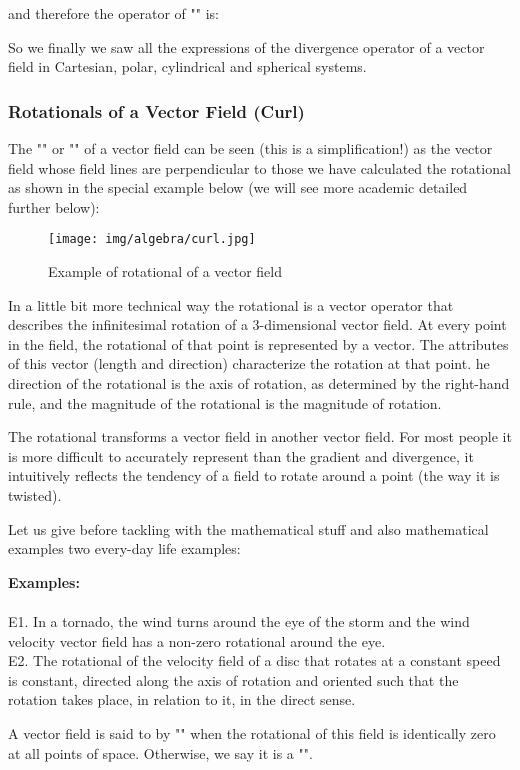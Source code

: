 	and therefore the operator of "" is:
	
	So we finally we saw all the expressions of the divergence operator of a vector field in Cartesian, polar, cylindrical and spherical systems.
	
	\pagebreak
	\subsubsection{Rotationals of a Vector Field (Curl)}\label{rotational}
	The "" or "" of a vector field can be seen (this is a simplification!) as the vector field whose field lines are perpendicular to those we have calculated the rotational as shown in the special example below (we will see more academic detailed further below):
	\begin{figure}[H]
	\centering
		\texttt{[image: img/algebra/curl.jpg]}
		\caption{Example of rotational of a vector field}
	\end{figure}
	In a little bit more technical way the rotational is a vector operator that describes the infinitesimal rotation of a $3$-dimensional vector field. At every point in the field, the rotational of that point is represented by a vector. The attributes of this vector (length and direction) characterize the rotation at that point. he direction of the rotational is the axis of rotation, as determined by the right-hand rule, and the magnitude of the rotational is the magnitude of rotation. 
	
	The rotational transforms a vector field in another vector field. For most people it is more difficult to accurately represent than the gradient and divergence, it intuitively reflects the tendency of a field to rotate around a point (the way it is twisted).
	
	Let us give before tackling with the mathematical stuff and also mathematical examples two every-day life examples:
	\begin{tcolorbox}[colframe=black,colback=white,sharp corners]
	\textbf{{\Large {}}Examples:}\\\\
	E1. In a tornado, the wind turns around the eye of the storm and the wind velocity vector field has a non-zero rotational around the eye.\\

	E2. The rotational of the velocity field of a disc that rotates at a constant speed is constant, directed along the axis of rotation and oriented such that the rotation takes place, in relation to it, in the direct sense.\\
	\end{tcolorbox}
	A vector field is said to by "\label{irrotational}" when the rotational of this field is identically zero at all points of space. Otherwise, we say it is a "".
	
